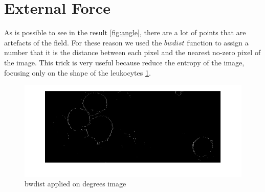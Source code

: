 \section{External Force}
As is possible to see in the result \ref{fig:angle}, there are a lot of points that are artefacts of the field. For these reason we used the $bwdist$ function to assign a number that it is the distance between each pixel and the nearest no-zero pixel of the image. This trick is very useful because reduce the entropy of the image, focusing only on the shape of the leukocytes \ref{fig:bwdistangle}.
\begin{figure}
	\begin{center}
		\centering
		\includegraphics[scale=0.5]{img/bwdistAngle.png}
		\caption{bwdist applied on degrees image}
		\label{fig:bwdistangle}
	\end{center}
\end{figure}

